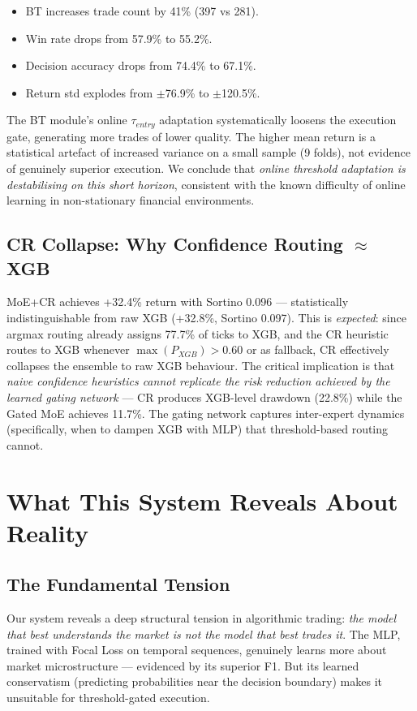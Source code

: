 \documentclass[conference]{IEEEtran}
\begin{document}
\begin{itemize}
    \item BT increases trade count by 41\% (397 vs 281).
    \item Win rate drops from 57.9\% to 55.2\%.
    \item Decision accuracy drops from 74.4\% to 67.1\%.
    \item Return std explodes from $\pm$76.9\% to $\pm$120.5\%.
\end{itemize}

The BT module's online $\tau_{entry}$ adaptation systematically loosens
the execution gate, generating more trades of lower quality. The higher
mean return is a statistical artefact of increased variance on a small
sample (9 folds), not evidence of genuinely superior execution. We
conclude that \textit{online threshold adaptation is destabilising on
this short horizon}, consistent with the known difficulty of online
learning in non-stationary financial environments.

\subsection{CR Collapse: Why Confidence Routing $\approx$ XGB}
MoE+CR achieves +32.4\% return with Sortino 0.096 --- statistically
indistinguishable from raw XGB (+32.8\%, Sortino 0.097). This is
\textit{expected}: since argmax routing already assigns 77.7\% of ticks
to XGB, and the CR heuristic routes to XGB whenever
$\max(P_{XGB}) > 0.60$ or as fallback, CR effectively collapses the
ensemble to raw XGB behaviour. The critical implication is that
\textit{naive confidence heuristics cannot replicate the risk reduction
achieved by the learned gating network} --- CR produces XGB-level
drawdown (22.8\%) while the Gated MoE achieves 11.7\%. The gating
network captures inter-expert dynamics (specifically, when to dampen
XGB with MLP) that threshold-based routing cannot.

\section{What This System Reveals About Reality}

\subsection{The Fundamental Tension}
Our system reveals a deep structural tension in algorithmic trading:
\textit{the model that best understands the market is not the model that
best trades it}. The MLP, trained with Focal Loss on temporal sequences,
genuinely learns more about market microstructure --- evidenced by its
superior F1. But its learned conservatism (predicting probabilities near
the decision boundary) makes it unsuitable for threshold-gated execution.
\end{document}
